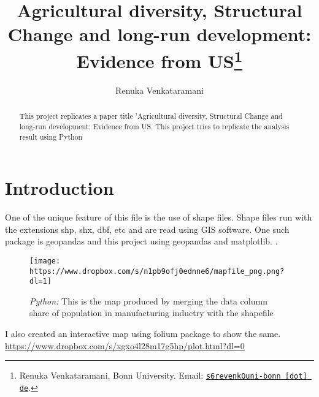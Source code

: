 \documentclass[11pt, a4paper, leqno]{article}
\begin{document}
\title{Agricultural diversity, Structural Change and long-run development: Evidence from US\thanks{Renuka Venkataramani, Bonn University. Email: \href{mailto:s6revenkQuni-bonn.de}{\nolinkurl{s6revenkQuni-bonn [dot] de}}.}}

\author{Renuka Venkataramani}


\maketitle


\begin{abstract}
    This project replicates a paper title 'Agricultural diversity, Structural Change and long-run development: Evidence from US.
    This project tries to replicate the analysis result using Python
    \citet{fiszbein2022agricultural}
\end{abstract}

\clearpage


\section{Introduction} %
\label{sec:introduction}

One of the unique feature of this file is the use of shape files. Shape files run with the extensions shp, shx, dbf, etc and are read using GIS software.
One such package is geopandas and this project using geopandas and matplotlib.
\citet{GaudeckerEconProjectTemplates}.




\begin{figure}[H]

    \centering
    \texttt{[image: https://www.dropbox.com/s/n1pb9ofj0ednne6/mapfile\_png.png?dl=1]}

    \caption{\emph{Python:} This is the map produced by merging the data column share of population in manufacturing
    inductry with the shapefile}
    \label{fig:Mapfile: Share of population in the manufacturing industry}

\end{figure}

I also created an interactive map using folium package to show the same. 
\url{https://www.dropbox.com/s/xgxo4l28m17g5hp/plot.html?dl=0}
\end{document}
